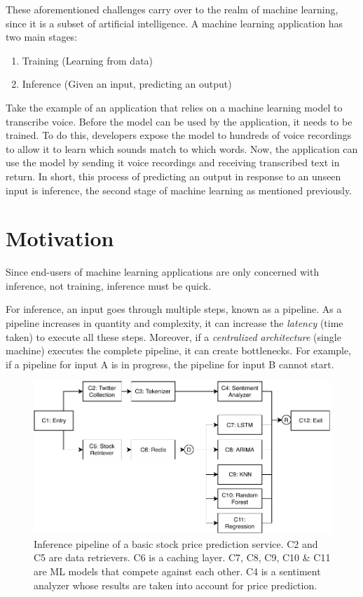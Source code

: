 \documentclass{report}
\begin{document}
These aforementioned challenges carry over to the realm of machine learning, since it is a subset of artificial intelligence. A machine learning application has two main stages:
\begin{enumerate}
  \item Training (Learning from data)
  \item Inference (Given an input, predicting an output)
\end{enumerate}

Take the example of an application that relies on a machine learning model to transcribe voice. Before the model can be used by the application, it needs to be trained. To do this, developers expose the model to hundreds of voice recordings to allow it to learn which sounds match to which words. Now, the application can use the model by sending it voice recordings and receiving transcribed text in return. In short, this process of predicting an output in response to an unseen input is inference, the second stage of machine learning as mentioned previously.

\section{Motivation}

Since end-users of machine learning applications are only concerned with inference, not training, inference must be quick.

For inference, an input goes through multiple steps, known as a pipeline. As a pipeline increases in quantity and complexity, it can increase the \textit{latency} (time taken) to execute all these steps. Moreover, if a \textit{centralized architecture} (single machine) executes the complete pipeline, it can create bottlenecks. For example, if a pipeline for input A is in progress, the pipeline for input B cannot start.

\begin{figure}
  \centering
  \includegraphics[width=\textwidth]{StockPriceServiceBasic.pdf}
  \caption{Inference pipeline of a basic stock price prediction service. C2 and C5 are data retrievers. C6 is a caching layer. C7, C8, C9, C10 \& C11 are ML models that compete against each other. C4 is a sentiment analyzer whose results are taken into account for price prediction.}
  \label{fig:StockPriceServiceBasic}
\end{figure}
\end{document}
